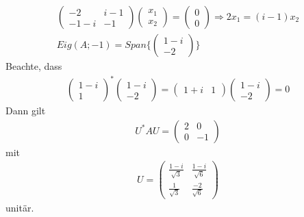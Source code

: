 \begin{itemize}
\begin{align}
\begin{pmatrix} -2 & i-1 \\ -1-i & -1\end{pmatrix} \begin{pmatrix} x_1 \\ x_2 \end{pmatrix} = \begin{pmatrix} 0 \\ 0 \end{pmatrix} \Rightarrow 2 x_1 = (i-1) x_2 \\
Eig(A; -1) = Span\{\begin{pmatrix} 1 - i \\ -2 \end{pmatrix}\}
\end{align}
Beachte, dass
\begin{align}
\begin{pmatrix} 1-i \\ 1\end{pmatrix}^{*} \begin{pmatrix} 1-i \\ -2\end{pmatrix} = \begin{pmatrix} 1 + i & 1\end{pmatrix} \begin{pmatrix} 1-i \\ -2 \end{pmatrix} = 0
\end{align}
Dann gilt 
\begin{align}
U^{*} A U = \begin{pmatrix} 2 & 0 \\ 0 & -1 \end{pmatrix}
\end{align}
mit
\begin{align}
U = \begin{pmatrix} \frac{1-i}{\sqrt{3}} & \frac{1-i}{\sqrt{6}} \\ \frac{1}{\sqrt{3}} & \frac{-2}{\sqrt{6}}\end{pmatrix}
\end{align}
unitär.


\end{itemize}
